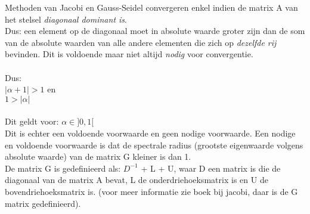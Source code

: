 Methoden van Jacobi en Gauss-Seidel convergeren enkel indien de matrix A van het stelsel \textit{diagonaal dominant is}.\\
Dus: een element op de diagonaal moet in absolute waarde groter zijn dan de som van de absolute waarden van alle andere elementen die zich op \textit{dezelfde rij} bevinden. Dit is voldoende maar niet altijd \textit{nodig} voor convergentie.\\\\
Dus:\\
$|\alpha+1| > 1$ en\\
$1 > |\alpha|$\\\\
Dit geldt voor:
$\alpha \in ]0,1[$\\

Dit is echter een voldoende voorwaarde en geen nodige voorwaarde.
Een nodige en voldoende voorwaarde is dat de spectrale radius
(grootste eigenwaarde volgens absolute waarde) van de matrix G kleiner is dan 1.\\
De matrix G is gedefinieerd als: $D^{-1}$ + L + U, waar D een matrix is die de diagonaal van de matrix A bevat, L de onderdriehoeksmatrix is en U de bovendriehoeksmatrix is. (voor meer informatie zie boek bij jacobi, daar is de G matrix gedefinieerd).
